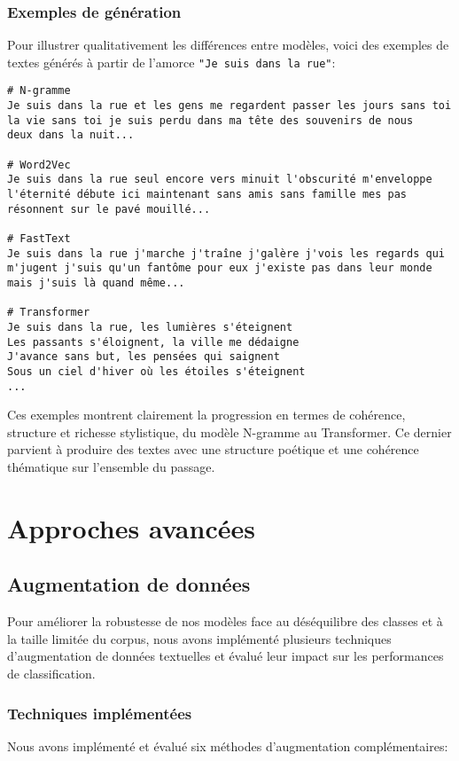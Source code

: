 \documentclass[a4paper,11pt]{article}
\begin{document}
\subsubsection{Exemples de génération}
Pour illustrer qualitativement les différences entre modèles, voici des exemples de textes générés à partir de l'amorce \texttt{"Je suis dans la rue"}:

\begin{lstlisting}[caption={Exemples de textes générés}, label=lst:examples]
# N-gramme
Je suis dans la rue et les gens me regardent passer les jours sans toi
la vie sans toi je suis perdu dans ma tête des souvenirs de nous
deux dans la nuit...

# Word2Vec
Je suis dans la rue seul encore vers minuit l'obscurité m'enveloppe 
l'éternité débute ici maintenant sans amis sans famille mes pas
résonnent sur le pavé mouillé...

# FastText
Je suis dans la rue j'marche j'traîne j'galère j'vois les regards qui
m'jugent j'suis qu'un fantôme pour eux j'existe pas dans leur monde
mais j'suis là quand même...

# Transformer
Je suis dans la rue, les lumières s'éteignent
Les passants s'éloignent, la ville me dédaigne
J'avance sans but, les pensées qui saignent
Sous un ciel d'hiver où les étoiles s'éteignent
...
\end{lstlisting}

Ces exemples montrent clairement la progression en termes de cohérence, structure et richesse stylistique, du modèle N-gramme au Transformer. Ce dernier parvient à produire des textes avec une structure poétique et une cohérence thématique sur l'ensemble du passage.

\section{Approches avancées}
\label{sec:advanced}

\subsection{Augmentation de données}
Pour améliorer la robustesse de nos modèles face au déséquilibre des classes et à la taille limitée du corpus, nous avons implémenté plusieurs techniques d'augmentation de données textuelles et évalué leur impact sur les performances de classification.

\subsubsection{Techniques implémentées}
Nous avons implémenté et évalué six méthodes d'augmentation complémentaires:
\end{document}
